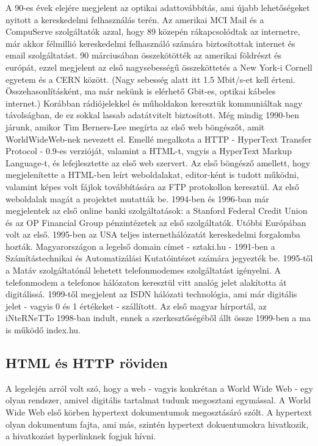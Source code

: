 \documentclass[a4paper, 12pt, oneside]{article}
\begin{document}
A 90-es évek elejére megjelent az optikai adattovábbítás, ami újabb lehetőségeket nyitott a kereskedelmi felhasználás terén. Az amerikai MCI Mail és a CompuServe szolgáltatók azzal, hogy 89 közepén rákapcsolódtak az internetre, már akkor félmillió kereskedelmi felhasználó számára biztosítottak internet és email szolgáltatást. 90 márciusában összekötötték az amerikai földrészt és európát, ezzel megjelent az első nagysebességű összeköttetés a New York-i Cornell egyetem és a CERN között. (Nagy sebesség alatt itt 1.5 Mbit/s-et kell érteni. Összehasonlításként, ma már nekünk is elérhető Gbit-es, optikai kábeles internet.) Korábban rádiójelekkel és műholdakon keresztük kommuniáltak nagy távolságban, de ez sokkal lassab adatátvitelt biztosított.
\bigbreak
Még mindig 1990-ben járunk, amikor Tim Berners-Lee megírta az első web böngészőt, amit WorldWideWeb-nek nevezett el. Emellé megalkota a HTTP - HyperText Transfer Protocol - 0.9-es verzióját, valamint a HTML-t, vagyis a HyperText Markup Language-t, és lefejlesztette az első web szervert. Az első böngésző amellett, hogy megjelenítette a HTML-ben leírt weboldalakat, editor-ként is tudott működni, valamint képes volt fájlok továbbítására az FTP protokollon keresztül. Az első weboldalak magát a projektet mutatták be. 1994-ben és 1996-ban már megjelentek az első online banki szolgáltatások: a Stanford Federal Credit Union és az OP Financial Group pénzintézetek az első szolgáltatók. Utóbbi Európában volt az első. 1995-ben az USA teljes internethálózatát kereskedelmi forgalomba hozták.
\bigbreak
Magyarországon a legelső domain címet - sztaki.hu - 1991-ben a Számítástechnikai és Automatizálási Kutatóintézet számára jegyezték be. 1995-től a Matáv szolgáltatónál lehetett telefonmodemes szolgáltatást igényelni. A telefonmodem a telefonos hálózaton keresztül vitt analóg jelet alakította át digitálissá. 1999-től megjelent az ISDN hálózati technológia, ami már digitális jelet - vagyis 0 és 1 értékeket - szállított. Az első magyar hírportál, az iNteRNeTTo 1998-ban indult, ennek a szerkesztőségéből állt össze 1999-ben a ma is működő index.hu.

\subsection*{HTML és HTTP röviden}

A legelején arról volt szó, hogy a web - vagyis konkrétan a World Wide Web - egy olyan rendszer, amivel digitális tartalmat tudunk megosztani egymással. A World Wide Web első körben hypertext dokumentumok megosztásáró szólt. A hypertext olyan dokumentum fajta, ami más, szintén hypertext dokuentumokra hivatkozik, a hivatkozást hyperlinknek fogjuk hívni.
\end{document}
